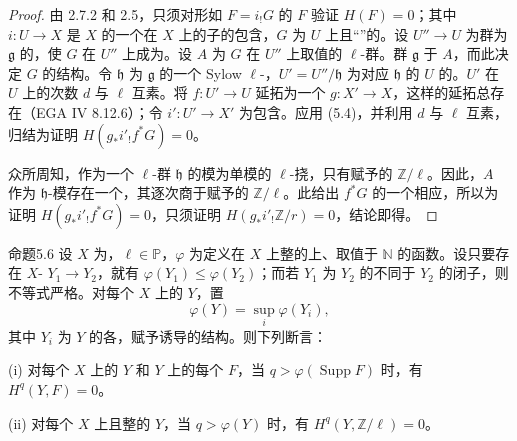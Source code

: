 \begin{proof}
由 2.7.2 和 2.5，只须对形如 $F=i_!G$ 的 $F$ 验证 $H(F)=0$；其中 $i:U\to X$ 是 $X$ 的一个在 $X$ 上的子的包含，$G$ 为 $U$ 上且“”的。设 $U''\to U$ 为群为 $\mathfrak g$ 的，使 $G$ 在 $U''$ 上成为。设 $A$ 为 $G$ 在 $U''$ 上取值的 $\ell$-群。群 $\mathfrak g$ 于 $A$，而此决定 $G$ 的结构。令 $\mathfrak h$ 为 $\mathfrak g$ 的一个 Sylow $\ell$-，$U'=U''/\mathfrak h$ 为对应 $\mathfrak h$ 的 $U$ 的。$U'$ 在 $U$ 上的次数 $d$ 与 $\ell$ 互素。将 $f:U'\to U$ 延拓为一个 $g:X'\to X$，这样的延拓总存在（EGA IV 8.12.6）；令 $i':U'\to X'$ 为包含。应用 (5.4)，并利用 $d$ 与 $\ell$ 互素，归结为证明 $H(g_*i'_!f^*G)=0$。

众所周知，作为一个 $\ell$-群 $\mathfrak h$ 的模为单模的 $\ell$-挠，只有赋予的 $\mathbb Z/\ell$。因此，$A$ 作为 $\mathfrak h$-模存在一个，其逐次商于赋予的 $\mathbb Z/\ell$。此给出 $f^*G$ 的一个相应，所以为证明 $H(g_*i'_!f^*G)=0$，只须证明 $H(g_*i'_!\mathbb Z/r)=0$，结论即得。
\end{proof}
\begin{SGAresult}{命题}{5.6}
设 $X$ 为，$\ell\in\mathbb P$，$\varphi$ 为定义在 $X$ 上整的上、取值于 $\mathbb N$ 的函数。设只要存在 $X$- $Y_1\to Y_2$，就有 $\varphi(Y_1)\le\varphi(Y_2)$；而若 $Y_1$ 为 $Y_2$ 的不同于 $Y_2$ 的闭子，则不等式严格。对每个 $X$ 上的 $Y$，置
\[
\varphi(Y)=\sup_i\varphi(Y_i),
\]
其中 $Y_i$ 为 $Y$ 的各，赋予诱导的结构。则下列断言：

(i) 对每个 $X$ 上的 $Y$ 和 $Y$ 上的每个 $F$，当 $q>\varphi(\operatorname{Supp}F)$ 时，有 $H^q(Y,F)=0$。

(ii) 对每个 $X$ 上且整的 $Y$，当 $q>\varphi(Y)$ 时，有 $H^q(Y,\mathbb Z/\ell)=0$。
\end{SGAresult}
